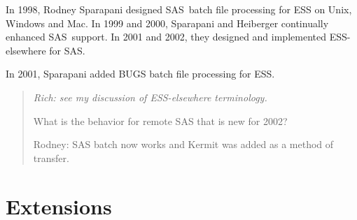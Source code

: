 \documentclass{article}
\newcommand*{\SAS}{\textsc{SAS}}
\newenvironment{Comment}{\begin{quote}\small\itshape }{\end{quote}}
\begin{document}
In 1998, Rodney Sparapani designed \SAS\ batch file processing for ESS
on Unix, Windows and Mac.  In 1999 and 2000, Sparapani and Heiberger
continually enhanced \SAS\ support. 
In 2001 and 2002, they designed and implemented ESS-elsewhere for \SAS.  

In 2001, Sparapani added BUGS batch file processing for ESS.

\begin{Comment}
Rich: see my discussion of ESS-elsewhere terminology.

What is the behavior for remote SAS that is new for 2002?

Rodney: SAS batch now works and Kermit was added as a method of transfer.
\end{Comment}


\section{Extensions}
\label{sec:extensions}


\end{document}

